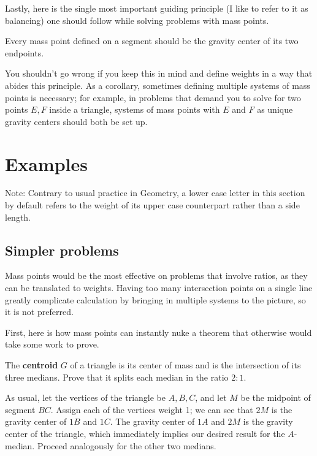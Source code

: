 \documentclass{article}
\begin{document}
Lastly, here is the single most important guiding principle (I like to refer to it as balancing) one should follow while solving problems with mass points. 

\begin{theo}
Every mass point defined on a segment should be the gravity center of its two endpoints.
\end{theo}

You shouldn't go wrong if you keep this in mind and define weights in a way that abides this principle. As a corollary, sometimes defining multiple systems of mass points is necessary; for example, in problems that demand you to solve for two points $E,F$ inside a triangle, systems of mass points with $E$ and $F$ as unique gravity centers should both be set up.

\section{Examples}
Note: Contrary to usual practice in Geometry, a lower case letter in this section by default refers to the weight of its upper case counterpart rather than a side length.
\subsection{Simpler problems}
Mass points would be the most effective on problems that involve ratios, as they can be translated to weights. Having too many intersection points on a single line greatly complicate calculation by bringing in multiple systems to the picture, so it is not preferred.

First, here is how mass points can instantly nuke a theorem that otherwise would take some work to prove.
\begin{exam}
The \textbf{centroid} $G$ of a triangle is its center of mass and is the intersection of its three medians. Prove that it splits each median in the ratio $2:1$.
\end{exam}
\begin{sol}
As usual, let the vertices of the triangle be $A,B,C$, and let $M$ be the midpoint of segment $BC$. Assign each of the vertices weight 1; we can see that $2M$ is the gravity center of $1B$ and $1C$. The gravity center of $1A$ and $2M$ is the gravity center of the triangle, which immediately implies our desired result for the $A$-median. Proceed analogously for the other two medians.
\end{sol}
\end{document}
